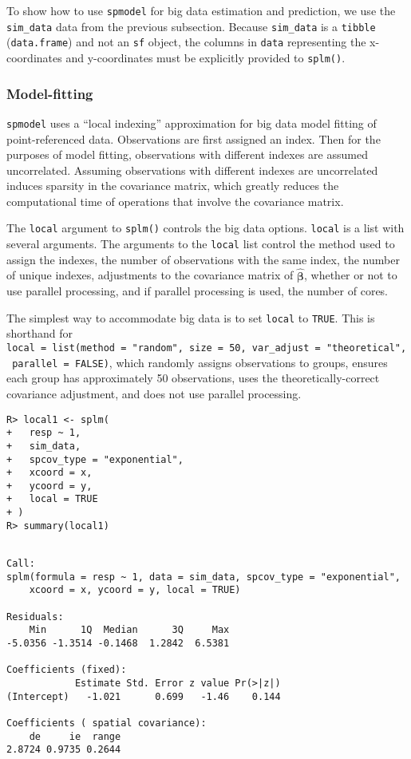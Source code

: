 \documentclass[10pt,letterpaper]{article}
\begin{document}
To show how to use \texttt{spmodel} for big data estimation and
prediction, we use the \texttt{sim\_data} data from the previous
subsection. Because \texttt{sim\_data} is a \texttt{tibble}
(\texttt{data.frame}) and not an \texttt{sf} object, the columns in
\texttt{data} representing the x-coordinates and y-coordinates must be
explicitly provided to \texttt{splm()}.

\hypertarget{model-fitting}{%
\subsubsection{Model-fitting}\label{model-fitting}}

\texttt{spmodel} uses a ``local indexing'' approximation for big data
model fitting of point-referenced data. Observations are first assigned
an index. Then for the purposes of model fitting, observations with
different indexes are assumed uncorrelated. Assuming observations with
different indexes are uncorrelated induces sparsity in the covariance
matrix, which greatly reduces the computational time of operations that
involve the covariance matrix.

The \texttt{local} argument to \texttt{splm()} controls the big data
options. \texttt{local} is a list with several arguments. The arguments
to the \texttt{local} list control the method used to assign the
indexes, the number of observations with the same index, the number of
unique indexes, adjustments to the covariance matrix of
\(\hat{\boldsymbol{\beta}}\), whether or not to use parallel processing,
and if parallel processing is used, the number of cores.

The simplest way to accommodate big data is to set \texttt{local} to
\texttt{TRUE}. This is shorthand for
\texttt{local\ =\ list(method\ =\ "random",\ size\ =\ 50,\ var\_adjust\ =\ "theoretical",\ parallel\ =\ FALSE)},
which randomly assigns observations to groups, ensures each group has
approximately 50 observations, uses the theoretically-correct covariance
adjustment, and does not use parallel processing.

\begin{verbatim}
R> local1 <- splm(
+   resp ~ 1,
+   sim_data,
+   spcov_type = "exponential",
+   xcoord = x,
+   ycoord = y,
+   local = TRUE
+ )
R> summary(local1)
\end{verbatim}

\begin{verbatim}

Call:
splm(formula = resp ~ 1, data = sim_data, spcov_type = "exponential", 
    xcoord = x, ycoord = y, local = TRUE)

Residuals:
    Min      1Q  Median      3Q     Max 
-5.0356 -1.3514 -0.1468  1.2842  6.5381 

Coefficients (fixed):
            Estimate Std. Error z value Pr(>|z|)
(Intercept)   -1.021      0.699   -1.46    0.144

Coefficients ( spatial covariance):
    de     ie  range 
2.8724 0.9735 0.2644 
\end{verbatim}
\end{document}
